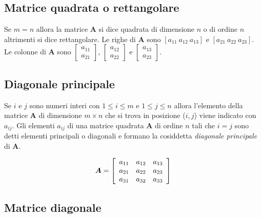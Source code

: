 \documentclass[
  11pt,
]{krantz}
\theoremstyle{definition}
\theoremstyle{definition}
\theoremstyle{definition}
\theoremstyle{definition}
\theoremstyle{remark}
\begin{document}
\hypertarget{matrice-quadrata-o-rettangolare}{%
\subsection{Matrice quadrata o rettangolare}\label{matrice-quadrata-o-rettangolare}}

Se \(m = n\) allora la matrice \(\boldsymbol{A}\) si dice quadrata di dimensione \(n\) o di ordine \(n\) altrimenti si dice rettangolare. Le righe di \(\boldsymbol{A}\) sono \([a_{11}\ a_{12}\ a_{13}]\) e \([a_{21}\ a_{22}\ a_{23}]\). Le colonne di \(\boldsymbol{A}\) sono \(\left[\begin{array}{c} a_{11} \\ a_{21} \end{array} \right]\), \(\left[ \begin{array}{c} a_{12} \\ a_{22} \end{array} \right]\) e \(\left[ \begin{array}{c} a_{13} \\ a_{23} \end{array} \right]\).

\hypertarget{diagonale-principale}{%
\subsection{Diagonale principale}\label{diagonale-principale}}

Se \(i\) e \(j\) sono numeri interi con \(1 \leq i \leq m\) e \(1 \leq j \leq n\) allora l'elemento della matrice \(\boldsymbol{A}\) di dimensione \(m \times n\) che si trova in posizione (\(i, j\)) viene indicato con \(a_{ij}\). Gli elementi \(a_{ij}\) di una matrice quadrata \(\boldsymbol{A}\) di ordine \(n\) tali che \(i = j\) sono detti elementi principali o diagonali e formano la cosiddetta \emph{diagonale principale} di \(\boldsymbol{A}\).

\[
\boldsymbol{A} =  \left[ \begin{array}{c c c}
a_{11} & a_{12} & a_{13}\\
a_{21} &  a_{22} & a_{23}\\
a_{31} & a_{32} & a_{33} \end{array} \right]
\]

\hypertarget{matrice-diagonale}{%
\subsection{Matrice diagonale}\label{matrice-diagonale}}
\end{document}
